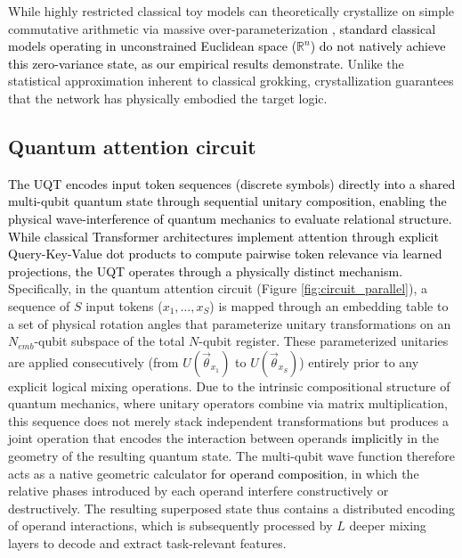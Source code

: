\documentclass[11pt, a4paper]{article}
\begin{document}
\vspace{0.2cm}

While highly restricted classical toy models can theoretically crystallize on simple commutative arithmetic via massive over-parameterization \cite{gromov2023grokking}, \textcolor{black}{standard classical models operating in unconstrained Euclidean space ($\mathbb{R}^n$) do not natively achieve this zero-variance state, as our empirical results demonstrate.} Unlike the statistical approximation inherent to classical grokking, crystallization guarantees that the network has physically embodied the target logic.


\subsection*{Quantum attention circuit}
\textcolor{black}{The UQT encodes \textcolor{black}{input token sequences (discrete symbols)} directly into a shared multi-qubit quantum state through sequential unitary composition, enabling the physical wave-interference of quantum mechanics to evaluate relational structure.} \textcolor{black}{While classical Transformer architectures \cite{vaswani2017attention} implement attention through explicit Query-Key-Value dot products to compute pairwise token relevance via learned projections, the UQT operates through a physically distinct mechanism.} Specifically, in the quantum attention circuit (Figure \ref{fig:circuit_parallel}), a sequence of $S$ input tokens ($x_1, \dots, x_S$) is mapped through an embedding table to a set of physical rotation angles that parameterize unitary transformations on an $N_{emb}$-qubit subspace of the total $N$-qubit register. These parameterized unitaries are applied consecutively (from $U(\vec{\theta}_{x_1})$ to $U(\vec{\theta}_{x_S})$) entirely prior to any explicit logical mixing operations. Due to the intrinsic compositional structure of quantum mechanics, where unitary operators combine via matrix multiplication, this sequence does not merely stack independent transformations but produces a joint operation that encodes the interaction between operands \textcolor{black}{implicitly} in the geometry of the resulting quantum state. The multi-qubit wave function therefore acts as a native geometric calculator \textcolor{black}{for operand composition}, in which the relative phases introduced by each operand interfere constructively or destructively. The resulting superposed state thus contains a distributed encoding of operand interactions, which is subsequently processed by $L$ deeper mixing layers to decode and extract task-relevant features.
\end{document}
